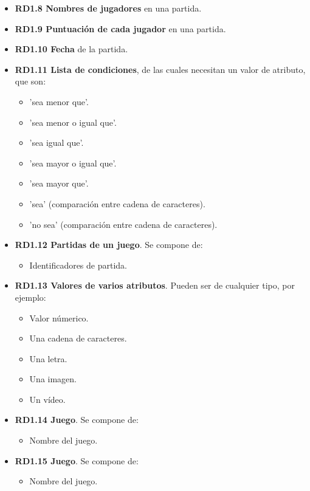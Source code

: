 \begin{itemize}
	\item \textbf{RD1.8 Nombres de jugadores} en una partida.
	
	\item \textbf{RD1.9 Puntuación de cada jugador} en una partida.
	
	\item \textbf{RD1.10 Fecha} de la partida.
	
	
	
	\item \textbf{RD1.11 Lista de condiciones}, de las cuales necesitan un valor de atributo, que son:
	\begin{itemize}
		\item 'sea menor que'.
		\item 'sea menor o igual que'.
		\item 'sea igual que'.
		\item 'sea mayor o igual que'.
		\item 'sea mayor que'.
		\item 'sea' (comparación entre cadena de caracteres).
		\item 'no sea' (comparación entre cadena de caracteres).
	\end{itemize}
	
	\item \textbf{RD1.12 Partidas de un juego}. Se compone de:
	\begin{itemize}
		\item Identificadores de partida.
	\end{itemize}
	
	\item \textbf{RD1.13 Valores de varios atributos}. Pueden ser de cualquier tipo, por ejemplo:
	\begin{itemize}
		\item Valor númerico.
		\item Una cadena de caracteres.
		\item Una letra.
		\item Una imagen.
		\item Un vídeo.
	\end{itemize}
	
	\item \textbf{RD1.14 Juego}. Se compone de:
	\begin{itemize}
		\item Nombre del juego.
	\end{itemize}
	
	\item \textbf{RD1.15 Juego}. Se compone de:
	\begin{itemize}
		\item Nombre del juego.
	\end{itemize}
	

\end{itemize}
